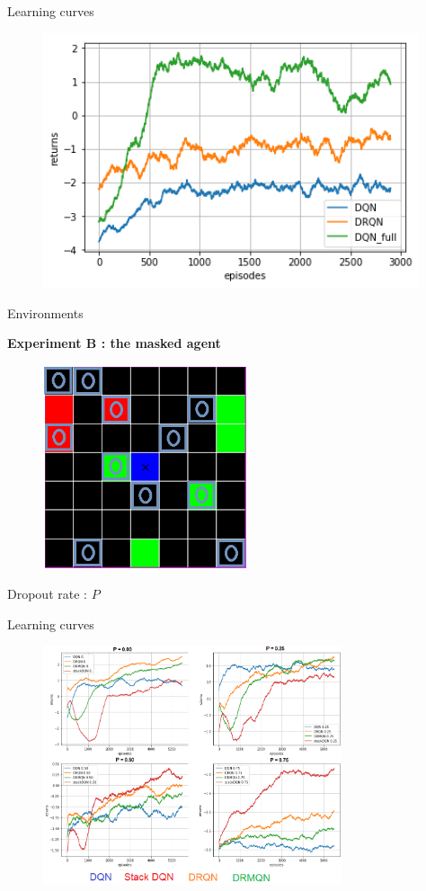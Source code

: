 \documentclass{beamer}
\begin{document}
\begin{frame}{Learning curves}
	\begin{figure}
		\includegraphics[height=7.5cm]{imgs/myopic_curves.png}
	\end{figure}
\end{frame}

\begin{frame}{Environments}
	
	\textbf{Experiment B : the masked agent}
	
	\begin{figure}
			\includegraphics[height=6cm]{imgs/masked.png}
	\end{figure}
	
	Dropout rate : $P$
\end{frame}

\begin{frame}{Learning curves}
	\begin{figure}
		\includegraphics[height=7cm]{imgs/masked_curves.png}
	\end{figure}
\end{frame}
\end{document}

